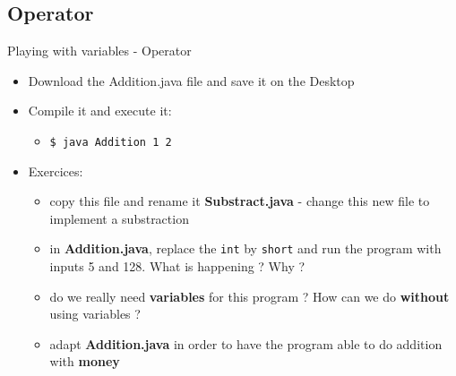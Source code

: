 {  \subsection{Operator}
  \begin{frame}
    \begin{block}{Playing with variables - Operator}
      \begin{itemize}
        \item Download the Addition.java file and save it on the Desktop
        \item Compile it and execute it:
        \begin{itemize}
          \item \texttt{\$ java Addition 1 2}
        \end{itemize}
        \item Exercices:
        \begin{itemize}
          \item copy this file and rename it \textbf{Substract.java} - change this new file to
          implement a substraction
          \item in \textbf{Addition.java}, replace the \texttt{int} by \texttt{short} and run the
          program with inputs 5 and 128. What is happening ? Why ?
          \item do we really need \textbf{variables} for this program ? How can we do
          \textbf{without} using variables ?
          \item adapt \textbf{Addition.java} in order to have the program able to do addition with
          \textbf{money}
        \end{itemize}
      \end{itemize}
    \end{block}
  \end{frame}



}

